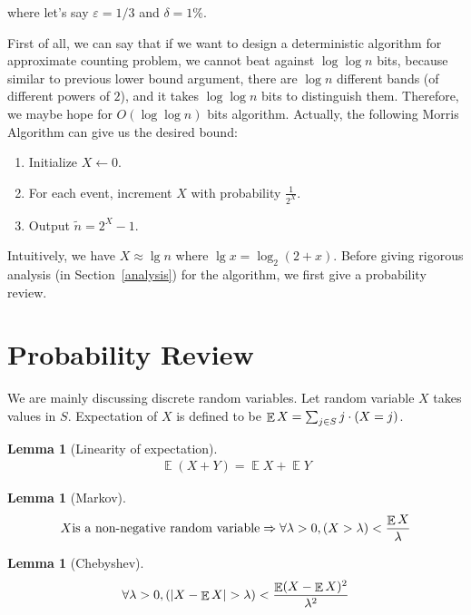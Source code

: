 \documentclass[11pt]{article}
\DeclareMathOperator*{\E}{\mathbb{E}}
\let\Pr\relax
\DeclareMathOperator*{\Pr}{\mathbb{P}}
\newtheorem{lemma}[theorem]{Lemma}
\begin{document}
where let's say $\varepsilon = 1/3$ and $\delta = 1\%$. 

First of all, we can say that if we want to design a deterministic algorithm for approximate counting problem, we cannot beat against $\log\log n$ bits, because similar to previous lower bound argument, there are $\log n$ different bands (of different powers of $2$), and it takes $\log\log n$ bits to distinguish them. Therefore, we maybe hope for $O(\log \log n)$ bits algorithm. Actually, the following Morris Algorithm can give us the desired bound:

\begin{enumerate}
\item{Initialize $X\leftarrow 0$.}
\item{For each event, increment $X$ with probability $\frac{1}{2^X}$.}
\item{Output $\tilde{n}=2^X-1$.}
\end{enumerate}

Intuitively, we have $X\approx \lg n$ where $\lg x =\log_2(2+x)$. Before giving rigorous analysis (in Section~\ref{analysis}) for the algorithm, we first give a probability review. 

\section{Probability Review}

We are mainly discussing discrete random variables. Let random variable $X$ takes values in $S$. Expectation of $X$ is defined to be $\E X = \sum_{j\in S} j\cdot \Pr(X=j)$.

\begin{lemma} [Linearity of expectation]
\begin{align} 
\E(X+Y)=\E X+\E Y
\end{align} 
\end{lemma}

\begin{lemma} [Markov]
\begin{align} 
X \text{is a non-negative random variable} \Rightarrow \forall \lambda>0,\Pr(X>\lambda)<\frac{\E X}{\lambda}
\end{align} 
\end{lemma}

\begin{lemma}[Chebyshev]
\begin{align}
\forall \lambda>0, \Pr(|X-\E X| > \lambda)<\frac{\E(X-\E X)^2}{\lambda^2}
\end{align}
\end{lemma}
\end{document}
